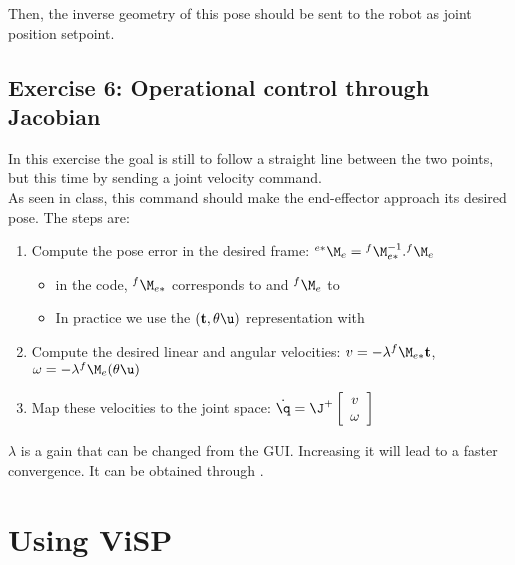 \documentclass{ecnreport}
\begin{document}
  Then, the inverse geometry of this pose should be sent to the robot as joint position setpoint.
  
  \newpage
  \subsection*{Exercise 6: Operational control through Jacobian}
  
  In this exercise the goal is still to follow a straight line between the two points, but this time by sending a joint velocity command.\\
  
  As seen in class, this command should make the end-effector approach its desired pose. The steps are:
  \begin{enumerate}
    \item Compute the pose error in the desired frame: ${}^{e*}\M_e = {}^{f}\M_{e*}^{-1}.{}^{f}\M_e$
    \begin{itemize}
      \item in the code, ${}^{f}\M_{e*}$ corresponds to  and ${}^{f}\M_e$ to  
      \item In practice we use the $(\mathbf{t}, \theta\u)$ representation with 
    \end{itemize}
    \item Compute the desired linear and angular velocities: $v = -\lambda{}^{f}\M_{e*}\mathbf{t}$, \quad $\omega = -\lambda{}^{f}\M_{e} (\theta\u)$
    \item Map these velocities to the joint space: $\dot\q = \J^+ \left[\begin{array}{c}v\\\omega\end{array}\right]$
  \end{enumerate}
  $\lambda$ is a gain that can be changed from the GUI. Increasing it will lead to a faster convergence. It can be obtained through .
  
  
  
  \appendix
  
  
  \newpage
  
  \section{Using ViSP}\label{visp}
  
\end{document}
